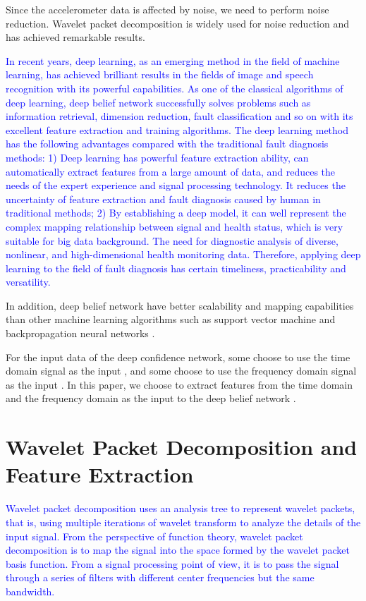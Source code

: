 \documentclass{modified}
\begin{document}
Since the accelerometer data is affected by noise, we need to perform noise reduction. Wavelet packet decomposition \cite{Wang2015Detection}\cite{Yongle2015Zero} is widely used for noise reduction and has achieved remarkable results.


\textcolor{blue}{In recent years, deep learning, as an emerging method in the field of machine learning, has achieved brilliant results in the fields of image and speech recognition with its powerful capabilities. As one of the classical algorithms of deep learning, deep belief network \cite{Hinton2012A} successfully solves problems such as information retrieval, dimension reduction, fault classification and so on with its excellent feature extraction and training algorithms. The deep learning method has the following advantages compared with the traditional fault diagnosis methods: 1) Deep learning has powerful feature extraction ability, can automatically extract features from a large amount of data, and reduces the needs of the expert experience and signal processing technology. It reduces the uncertainty of feature extraction and fault diagnosis caused by human in traditional methods; 2) By establishing a deep model, it can well represent the complex mapping relationship between signal and health status, which is very suitable for big data background. The need for diagnostic analysis of diverse, nonlinear, and high-dimensional health monitoring data. Therefore, applying deep learning to the field of fault diagnosis has certain timeliness, practicability and versatility.}

In addition, deep belief network have better scalability and mapping capabilities than other machine learning algorithms such as support vector machine \cite{vapnik1999overview} and backpropagation neural networks \cite{Kramer1990Diagnosis}.

For the input data of the deep confidence network, some choose to use the time domain signal as the input \cite{guangquan2016fault}, and some choose to use the frequency domain signal as the input \cite{jia2016deep}. In this paper, we choose to extract features from the time domain and the frequency domain as the input to the deep belief network \cite{YiThe}.

\section{Wavelet Packet Decomposition and Feature Extraction}
\textcolor{blue}{Wavelet packet decomposition uses an analysis tree to represent wavelet packets, that is, using multiple iterations of wavelet transform to analyze the details of the input signal. From the perspective of function theory, wavelet packet decomposition is to map the signal into the space formed by the wavelet packet basis function. From a signal processing point of view, it is to pass the signal through a series of filters with different center frequencies but the same bandwidth.}
\end{document}
